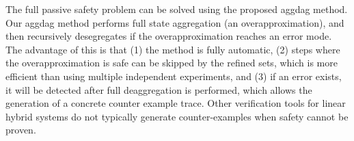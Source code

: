 The full passive safety problem can be solved using the proposed aggdag method. Our aggdag method performs full state aggregation (an overapproximation), and then recursively desegregates if the overapproximation reaches an error mode. The advantage of this is that (1) the method is fully automatic, (2) steps where the overapproximation is safe can be skipped by the refined sets, which is more efficient than using multiple independent experiments, and (3) if an error exists, it will be detected after full deaggregation is performed, which allows the generation of a concrete counter example trace. Other verification tools for linear hybrid systems do not typically generate counter-examples when safety cannot be proven.

